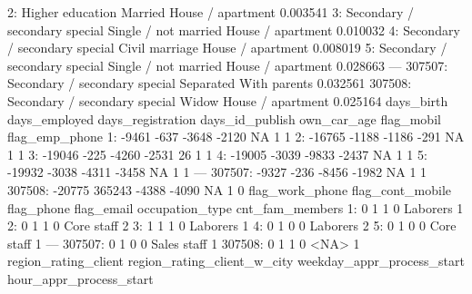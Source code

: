 \documentclass[a4paper]{article}
\begin{document}
\begin{Schunk}
\begin{Soutput}
     2:              Higher education              Married House / apartment                   0.003541
     3: Secondary / secondary special Single / not married House / apartment                   0.010032
     4: Secondary / secondary special       Civil marriage House / apartment                   0.008019
     5: Secondary / secondary special Single / not married House / apartment                   0.028663
    ---                                                                                                
307507: Secondary / secondary special            Separated      With parents                   0.032561
307508: Secondary / secondary special                Widow House / apartment                   0.025164
        days_birth days_employed days_registration days_id_publish own_car_age flag_mobil flag_emp_phone
     1:      -9461          -637             -3648           -2120          NA          1              1
     2:     -16765         -1188             -1186            -291          NA          1              1
     3:     -19046          -225             -4260           -2531          26          1              1
     4:     -19005         -3039             -9833           -2437          NA          1              1
     5:     -19932         -3038             -4311           -3458          NA          1              1
    ---                                                                                                 
307507:      -9327          -236             -8456           -1982          NA          1              1
307508:     -20775        365243             -4388           -4090          NA          1              0
        flag_work_phone flag_cont_mobile flag_phone flag_email occupation_type cnt_fam_members
     1:               0                1          1          0        Laborers               1
     2:               0                1          1          0      Core staff               2
     3:               1                1          1          0        Laborers               1
     4:               0                1          0          0        Laborers               2
     5:               0                1          0          0      Core staff               1
    ---                                                                                       
307507:               0                1          0          0     Sales staff               1
307508:               0                1          1          0            <NA>               1
        region_rating_client region_rating_client_w_city weekday_appr_process_start hour_appr_process_start

\end{Soutput}
\end{Schunk}
\end{document}
